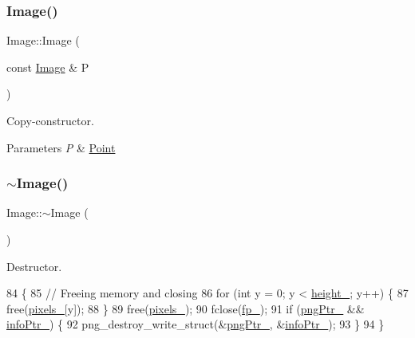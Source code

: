 \subsubsection{\texorpdfstring{Image()}{Image()}\hspace{0.1cm}{\footnotesize\ttfamily [2/2]}}
{\footnotesize\ttfamily Image\+::\+Image (\begin{DoxyParamCaption}\item[{const \mbox{\hyperlink{class_image}{Image}} \&}]{P }\end{DoxyParamCaption})}



Copy-\/constructor. 


\begin{DoxyParams}{Parameters}
{\em P} & \mbox{\hyperlink{class_point}{Point}} \\
\hline
\end{DoxyParams}
\mbox{\label{class_image_a0294f63700543e11c0f0da85601c7ae5}} 
\subsubsection{\texorpdfstring{$\sim$\+Image()}{~Image()}}
{\footnotesize\ttfamily Image\+::$\sim$\+Image (\begin{DoxyParamCaption}{ }\end{DoxyParamCaption})}



Destructor. 


\begin{DoxyCode}
84               \{
85     \textcolor{comment}{// Freeing memory and closing}
86     \textcolor{keywordflow}{for} (\textcolor{keywordtype}{int} y = 0; y < \mbox{\hyperlink{class_image_a64a699c5bb8e8a18c6971a8032806dba}{height\_}}; y++) \{
87         free(\mbox{\hyperlink{class_image_a51351c8507499d09cb9667c20ef01faf}{pixels\_}}[y]);
88       \}
89     free(\mbox{\hyperlink{class_image_a51351c8507499d09cb9667c20ef01faf}{pixels\_}});
90     fclose(\mbox{\hyperlink{class_image_a4d43b19efb469f7c9fb65e7202d7ba7f}{fp\_}});
91     \textcolor{keywordflow}{if} (\mbox{\hyperlink{class_image_aaf607d2596bac09b13370599d9ba6d8c}{pngPtr\_}} \&\& \mbox{\hyperlink{class_image_a505878e5e19500e3cc1b940067faa584}{infoPtr\_}}) \{
92         png\_destroy\_write\_struct(\&\mbox{\hyperlink{class_image_aaf607d2596bac09b13370599d9ba6d8c}{pngPtr\_}}, \&\mbox{\hyperlink{class_image_a505878e5e19500e3cc1b940067faa584}{infoPtr\_}});
93     \}
94 \}
\end{DoxyCode}



